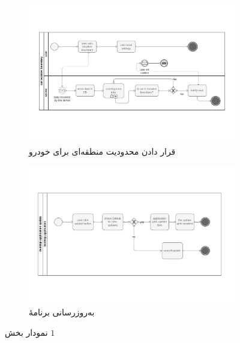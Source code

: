 \begin{figure}[!ht]
    \centering
    \footnotesize
    \begin{subfigure}[t]{0.47\linewidth}
        \centering
        \includegraphics[width=\textwidth]{../diagrams/bpmn-diagram-3.pdf}
        \caption{
            قرار دادن محدودیت منطقه‌ای برای خودرو
        }
        \label{subfig1:fig6:sec5:chap2}
    \end{subfigure}
    \begin{subfigure}[t]{0.47\linewidth}
        \centering
        \includegraphics[width=\textwidth]{../diagrams/bpmn-diagram-4.pdf}
        \caption{
            به‌روزرسانی برنامهٔ
        }
        \label{subfig2:fig6:sec5:chap2}
    \end{subfigure}
    \hspace*{1cm}
    \normalsize
    \label{fig6:sec5:chap2}
    \caption{
        نمودار
        بخش
        $1$
    }
\end{figure}